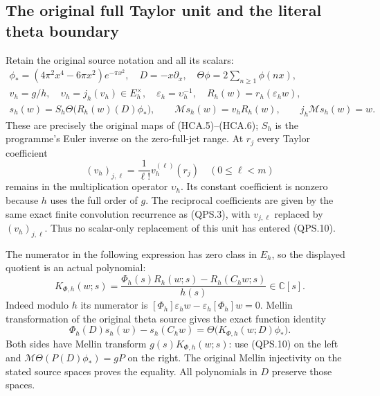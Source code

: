 \subsection{The original full Taylor unit and the literal theta boundary}

Retain the original source notation and all its scalars:
\[
 \begin{gathered}
 \phi_*=(4\pi^2x^4-6\pi x^2)e^{-\pi x^2},\quad
 D=-x\partial_x,\quad \Theta\phi=2\sum_{n\geq1}\phi(nx),\\
 v_h=g/h,\quad \upsilon_h=j_h(v_h)\in E_h^\times,\quad
 \varepsilon_h=\upsilon_h^{-1},\quad
 R_h(w)=r_h(\varepsilon_hw),\\
 s_h(w)=S_h\Theta\bigl(R_h(w)(D)\phi_*\bigr),\qquad
 \mathcal M s_h(w)=v_hR_h(w),\qquad j_h\mathcal M s_h(w)=w.
 \end{gathered}
 \tag{QPS.10}
\]
These are precisely the original maps of (HCA.5)--(HCA.6);
\(S_h\) is the programme's Euler inverse on the zero-full-jet
range. At \(r_j\) every Taylor coefficient
\[
 (v_h)_{j,\ell}=\frac{1}{\ell!}v_h^{(\ell)}(r_j)
 \quad(0\leq\ell<m)
 \tag{QPS.11}
\]
remains in the multiplication operator \(\upsilon_h\). Its constant
coefficient is nonzero because \(h\) uses the full order of \(g\).
The reciprocal coefficients are given by the same exact finite
convolution recurrence as (QPS.3), with \(v_{j,\ell}\) replaced
by \((v_h)_{j,\ell}\). Thus no scalar-only replacement of this unit
has entered (QPS.10).

The numerator in the following expression has zero class in \(E_h\),
so the displayed quotient is an actual polynomial:
\[
 K_{\Phi,h}(w;s)=
   \frac{\Phi_h(s)R_h(w;s)-R_h(C_hw;s)}{h(s)}
   \in\mathbb{C}[s].
 \tag{QPS.12}
\]
Indeed modulo \(h\) its numerator is
\([\Phi_h]\varepsilon_hw-\varepsilon_h[\Phi_h]w=0\).
Mellin transformation of the original theta source gives the exact
function identity
\[
 \Phi_h(D)s_h(w)-s_h(C_hw)
      =\Theta\bigl(K_{\Phi,h}(w;D)\phi_*\bigr).
 \tag{QPS.13}
\]
Both sides have Mellin transform \(g(s)K_{\Phi,h}(w;s)\):
use (QPS.10) on the left and
\(\mathcal M\Theta(P(D)\phi_*)=gP\) on the right.
The original Mellin injectivity on the stated source spaces proves
the equality. All polynomials in \(D\) preserve those spaces.

